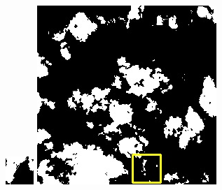 \documentclass[10pt]{ctexart}
\begin{document}
\begin{multicols}{2}
\begin{figure}[H]
{\begin{minipage}[b]{0.15\linewidth}
            \includegraphics[width=1\linewidth]{../log/spoon2/cut/tmp_cut_LC80350192014190LGN00_06561_my.jpg}\vspace{4pt}
            \includegraphics[width=1\linewidth]{../log/spoon2/cut/LC80980712014024LGN00_15443_my.jpg}\vspace{4pt}

\end{minipage}}
\end{figure}
\end{multicols}
\end{document}
